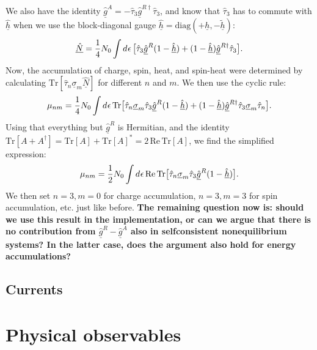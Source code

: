 We also have the identity $\underline{\hat{g}}^A = -\hat{\tau}_3 \underline{\hat{g}}^{R\dagger} \hat{\tau}_3$, and know that $\hat{\tau}_3$ has to commute with $\underline{\hat{h}}$ when we use the block-diagonal gauge $\underline{\hat{h}} = \text{diag}(+\underline{h},-\underline{\tilde{h}})$:
\begin{equation}
  \underline{\hat{N}} = \frac{1}{4} N_0 \int d^{}\epsilon \, \big[ \hat{\tau}_3 \underline{\hat{g}}^R (1-\underline{\hat{h}}) + (1-\underline{\hat{h}}) \underline{\hat{g}}^{R\dagger} \hat{\tau}_3 \big].
\end{equation}
Now, the accumulation of charge, spin, heat, and spin-heat were determined by calculating $\text{Tr}[\hat{\tau}_n \underline{\sigma}_m \underline{\hat{N}}]$ for different $n$ and $m$.
We then use the cyclic rule:
\begin{equation}
  \mu_{nm} = \frac{1}{4} N_0 \int d^{}\epsilon \, \text{Tr}\big[ \hat{\tau}_n \underline{\sigma}_m \hat{\tau}_3 \underline{\hat{g}}^R (1-\underline{\hat{h}}) + (1-\underline{\hat{h}}) \underline{\hat{g}}^{R\dagger} \hat{\tau}_3 \underline{\sigma}_m \hat{\tau}_n\big].
\end{equation}
Using that everything but $\underline{\hat{g}}^R$ is Hermitian, and the identity $\text{Tr}[A+A^\dagger] = \text{Tr}[A] + \text{Tr}[A]^* = 2\,\text{Re}\,\text{Tr}[A]$, we find the simplified expression:
\begin{equation}
  \mu_{nm} = \frac{1}{2} N_0 \int d^{}\epsilon \, \text{Re}\,\text{Tr}\big[ \hat{\tau}_n \underline{\sigma}_m \hat{\tau}_3 \underline{\hat{g}}^R (1-\underline{\hat{h}}) \big].
\end{equation}
We then set $n=3, m=0$ for charge accumulation, $n=3, m=3$ for spin accumulation, etc. just like before.
\textbf{The remaining question now is: should we use this result in the implementation, or can we argue that there is no contribution from $\underline{\hat{g}}^R-\underline{\hat{g}}^A$ also in selfconsistent nonequilibrium systems? In the latter case, does the argument also hold for energy accumulations?}

\section{Currents}




\chapter{Physical observables}
